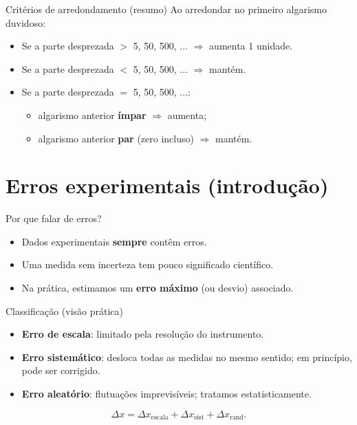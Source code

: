 \documentclass[aspectratio=169,10pt]{beamer}
\begin{document}
\begin{frame}{Critérios de arredondamento (resumo)}
Ao arredondar no primeiro algarismo duvidoso:
\begin{itemize}
  \item Se a parte desprezada \(>\) 5, 50, 500, ... \(\Rightarrow\) aumenta 1 unidade.
  \item Se a parte desprezada \(<\) 5, 50, 500, ... \(\Rightarrow\) mantém.
  \item Se a parte desprezada \(=\) 5, 50, 500, ...:
  \begin{itemize}
    \item algarismo anterior \textbf{ímpar} \(\Rightarrow\) aumenta;
    \item algarismo anterior \textbf{par} (zero incluso) \(\Rightarrow\) mantém.
  \end{itemize}
\end{itemize}
\end{frame}

\section{Erros experimentais (introdução)}

\begin{frame}{Por que falar de erros?}
\begin{itemize}
  \item Dados experimentais \textbf{sempre} contêm erros.
  \item Uma medida sem incerteza tem pouco significado científico.
  \item Na prática, estimamos um \textbf{erro máximo} (ou desvio) associado.
\end{itemize}
\end{frame}

\begin{frame}{Classificação (visão prática)}
\begin{itemize}
  \item \textbf{Erro de escala}: limitado pela resolução do instrumento.
  \item \textbf{Erro sistemático}: desloca todas as medidas no mesmo sentido; em princípio, pode ser corrigido.
  \item \textbf{Erro aleatório}: flutuações imprevisíveis; tratamos estatisticamente.
\end{itemize}

\begin{equation}
\label{eq:erro_maximo}
\Delta x = \Delta x_{\text{escala}} + \Delta x_{\text{sist}} + \Delta x_{\text{rand}}.
\end{equation}
\end{frame}
\end{document}
